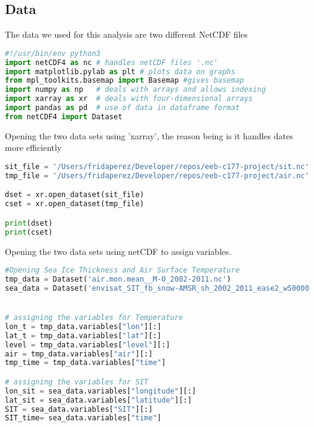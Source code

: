 \documentclass{article}
\begin{document}
\subsection{Data}
The data we used for this analysis are two different NetCDF files
\begin{lstlisting}[language=Python]
#!/usr/bin/env python3
import netCDF4 as nc # handles netCDF files '.nc'
import matplotlib.pylab as plt # plots data on graphs
from mpl_toolkits.basemap import Basemap #gives basemap 
import numpy as np   # deals with arrays and allows indexing
import xarray as xr  # deals with four-dimensional arrays
import pandas as pd  # use of data in dataframe format 
from netCDF4 import Dataset  

\end{lstlisting}

Opening the two data sets using 'xarray', the reason being is it handles dates more efficiently 

\begin{lstlisting}[language=Python]
sit_file = '/Users/fridaperez/Developer/repos/eeb-c177-project/sit.nc'
tmp_file = '/Users/fridaperez/Developer/repos/eeb-c177-project/air.nc'

dset = xr.open_dataset(sit_file)
cset = xr.open_dataset(tmp_file)

print(dset)
print(cset)
\end{lstlisting}{}

Opening the two data sets using netCDF to assign variables.  
\begin{lstlisting}[language=Python]
#Opening Sea Ice Thickness and Air Surface Temperature
tmp_data = Dataset('air.mon.mean__M-O_2002-2011.nc')
sea_data = Dataset('envisat_SIT_fb_snow-AMSR_sh_2002_2011_ease2_w50000.nc')


# assigning the variables for Temperature
lon_t = tmp_data.variables["lon"][:]
lat_t = tmp_data.variables["lat"][:]
level = tmp_data.variables["level"][:]
air = tmp_data.variables["air"][:]
tmp_time = tmp_data.variables["time"]

# assigning the variables for SIT
lon_sit = sea_data.variables["longitude"][:]
lat_sit = sea_data.variables["latitude"][:]
SIT = sea_data.variables["SIT"][:]
SIT_time= sea_data.variables["time"]
\end{lstlisting}{}
\end{document}
